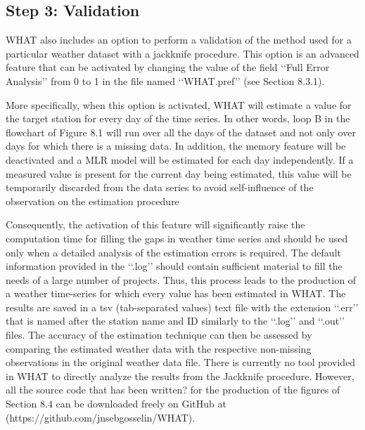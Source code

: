 \documentclass[TechnicalNoteMeteo.tex]{subfiles}
\begin{document}
\subsection{Step 3: Validation}

WHAT also includes an option to perform a validation of the method used for a particular weather dataset with a jackknife procedure. This option is an advanced feature that can be activated by changing the value of the field ‘‘Full Error Analysis’’ from 0 to 1 in the file named ‘‘WHAT.pref’’ (see Section 8.3.1).

More specifically, when this option is activated, WHAT will estimate a value for the target station for every day of the time series. In other words, loop B in the flowchart of Figure 8.1 will run over all the days of the dataset and not only over days for which there is a missing data. In addition, the memory feature will be deactivated and a MLR model will be estimated for each day independently. If a measured value is present for the current day being estimated, this value will be temporarily discarded from the data series to avoid self-influence of the observation on the estimation procedure

Consequently, the activation of this feature will significantly raise the computation time for filling the gaps in weather time series and should be used only when a detailed analysis of the estimation errors is required. The default information provided in the ‘‘.log’’ should contain sufficient material to fill the needs of a large number of projects. Thus, this process leads to the production of a weather time-series for which every value has been estimated in WHAT. The results are saved in a tsv (tab-separated values) text file with the extension ‘‘.err’’ that is named after the station name and ID similarly to the ‘‘.log’’ and ‘‘.out’’ files.
The accuracy of the estimation technique can then be assessed by comparing the estimated weather data with the respective non-missing observations in the original weather data file. There is currently no tool provided in WHAT to directly analyze the results from the Jackknife procedure. However, all the source code that has been written? for the production of the figures of Section 8.4 can be downloaded freely on GitHub at (https://github.com/jnsebgosselin/WHAT).
\end{document}
